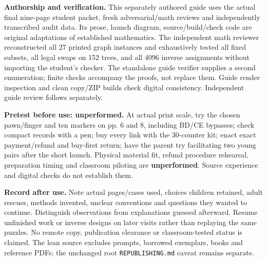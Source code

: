 \documentclass[11pt,letterpaper]{article}
\begin{document}
\textbf{Authorship and verification.} This separately authored guide uses the actual final nine-page student packet, fresh adversarial/math reviews and independently transcribed audit data. Its prose, launch diagram, source/build/check code are original adaptations of established mathematics. The independent math reviewer reconstructed all 27 printed graph instances and exhaustively tested all fixed subsets, all legal swaps on 152 trees, and all 4096 inverse assignments without importing the student's checker. The standalone guide verifier supplies a second enumeration; finite checks accompany the proofs, not replace them. Guide render inspection and clean copy/ZIP builds check digital consistency. Independent guide review follows separately.

\textbf{Pretest before use: unperformed.} At actual print scale, try the chosen pawn/finger and ten markers on pp. 6 and 8, including BD/CE bypasses; check compact records with a pen; buy every link with the 30-counter kit; enact exact payment/refund and buy-first return; have the parent try facilitating two young pairs after the short launch. Physical material fit, refund procedure rehearsal, preparation timing and classroom piloting are \textbf{unperformed}. Source experience and digital checks do not establish them.

\textbf{Record after use.} Note actual pages/cases used, choices children retained, adult rescues, methods invented, unclear conventions and questions they wanted to continue. Distinguish observations from explanations guessed afterward. Resume unfinished work or inverse designs on later visits rather than replaying the same puzzles. No remote copy, publication clearance or classroom-tested status is claimed. The lean source excludes prompts, borrowed exemplars, books and reference PDFs; the unchanged root \texttt{REPUBLISHING.md} caveat remains separate.
\end{document}
